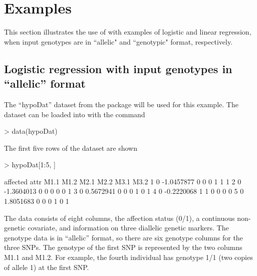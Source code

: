 \documentclass[article, shortnames]{jss}
\begin{document}
\section{Examples} \label{section.examples}

This section illustrates the use of  with examples of logistic 
and linear regression, when input genotypes are in ``allelic" and ``genotypic" 
format, respectively.

\subsection{Logistic regression with input genotypes in ``allelic'' format}

The ``hypoDat'' dataset from the  package will be used 
for this example. The dataset can be loaded into  with the command

\begin{Schunk}
\begin{Sinput}
> data(hypoDat)
\end{Sinput}
\end{Schunk}

The first five rows of the dataset are shown
\begin{Schunk}
\begin{Sinput}
> hypoDat[1:5, ]
\end{Sinput}
\begin{Soutput}
  affected       attr M1.1 M1.2 M2.1 M2.2 M3.1 M3.2
1        0 -1.0457877    0    0    0    1    1    1
2        0 -1.3604013    0    0    0    0    0    1
3        0  0.5672941    0    0    0    1    0    1
4        0 -0.2220068    1    1    0    0    0    0
5        0  1.8051683    0    0    0    1    0    1
\end{Soutput}
\end{Schunk}
The data consists of eight columns, the affection status (0/1), a continuous 
non-genetic covariate, and information on three diallelic genetic markers. 
The genotype data is in ``allelic'' format, so there are six genotype columns 
for the three SNPs. The genotype of the first SNP is represented by the two 
columns M1.1 and M1.2. For example, the fourth individual has genotype 
1/1 (two copies of allele 1) at the first SNP.
\end{document}
